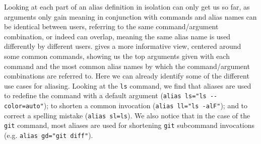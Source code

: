 Looking at each part of an alias definition in isolation can only get us so far, as arguments only gain meaning in conjunction with commands and alias names can be identical between users, referring to the same command/argument combination, or indeed can overlap, meaning the same alias name is used differently by different users.
 gives a more informative view, centered around some common commands, showing us the top arguments given with each command and the most common alias names by which the command/argument combinations are referred to.
Here we can already identify some of the different use cases for aliasing.
Looking at the \texttt{ls} command, we find that aliases are used 
to redefine the command with a default argument (\verb|alias ls="ls --color=auto"|);
to shorten a common invocation (\verb|alias ll="ls -alF"|);
and to correct a spelling mistake (\verb|alias sl=ls|).
We also notice that in the case of the \texttt{git} command, most aliases are used for shortening \texttt{git} subcommand invocations (e.g. \verb|alias gd="git diff"|).

\newcommand{\numx}[1]{{\small (\num{#1})}}


